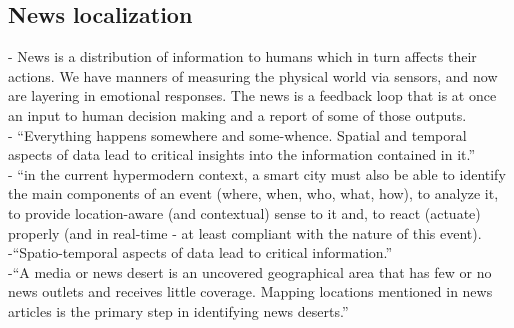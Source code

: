 \subsection{News localization}
- {\color{purple}News is a distribution of information to humans which in turn affects their actions. We have manners of measuring the physical world via sensors, and now are layering in emotional responses. The news is a feedback loop that is at once an input to human decision making and a report of some of those outputs.} \\
- {\color{orange}“Everything happens somewhere and some-whence. Spatial and temporal aspects of data lead to critical insights into the information contained in it.”}\cite{Bhattacharya2018}\\
- {\color{orange} “in the current hypermodern context, a smart city must also be able to identify the main components of an event (where, when, who, what, how), to analyze it, to provide location-aware (and contextual) sense to it and, to react (actuate) properly (and in real-time - at least compliant with the nature of this event).} \cite{Roche2012}\\
-{\color{orange}“Spatio-temporal aspects of data lead to critical information.”}\cite{Bhattacharya2018}\\
-{\color{orange}“A media or news desert is an uncovered geographical area that has few or no news outlets and receives little coverage. Mapping locations mentioned in news articles is the primary step in identifying news deserts.”\cite{Gupta2020}}\\

